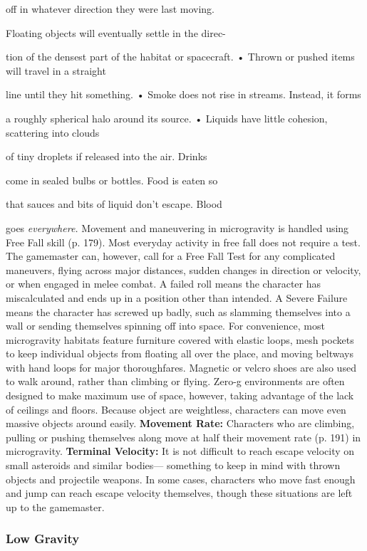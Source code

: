 off in whatever direction they were last moving. 

Floating objects will eventually settle in the direc-

tion of the densest part of the habitat or spacecraft.
•  Thrown or pushed items will travel in a straight 

line until they hit something.
•  Smoke does not rise in streams. Instead, it forms 

a roughly spherical halo around its source.
•  Liquids have little cohesion, scattering into clouds 

of tiny droplets if released into the air. Drinks 

come in sealed bulbs or bottles. Food is eaten so 

that sauces and bits of liquid don't escape. Blood 

goes \textit{everywhere.}
Movement and maneuvering in microgravity is 
handled using Free Fall skill (p. 179). Most everyday 
activity in free fall does not require a test. The gamemaster
can, however, call for a Free Fall Test for any
complicated maneuvers, flying across major distances, 
sudden changes in direction or velocity, or when engaged
in melee combat. A failed roll means the character
has miscalculated and ends up in a position other
than intended. A Severe Failure means the character has 
screwed up badly, such as slamming themselves into a 
wall or sending themselves spinning off into space.
For convenience, most microgravity habitats 
feature furniture covered with elastic loops, mesh 
pockets to keep individual objects from floating all 
over the place, and moving beltways with hand loops 
for major thoroughfares. Magnetic or velcro shoes 
are also used to walk around, rather than climbing 
or flying. Zero-g environments are often designed to 
make maximum use of space, however, taking advantage
of the lack of ceilings and floors. Because object
are weightless, characters can move even massive 
objects around easily.
\textbf{Movement Rate: }Characters who are climbing, pulling
or pushing themselves along move at half their
movement rate (p. 191) in microgravity.
\textbf{Terminal Velocity:} It is not difficult to reach escape 
velocity on small asteroids and similar bodies—
something to keep in mind with thrown objects and 
projectile weapons. In some cases, characters who 
move fast enough and jump can reach escape velocity
themselves, though these situations are left up to
the gamemaster.

\subsubsection{Low Gravity}

